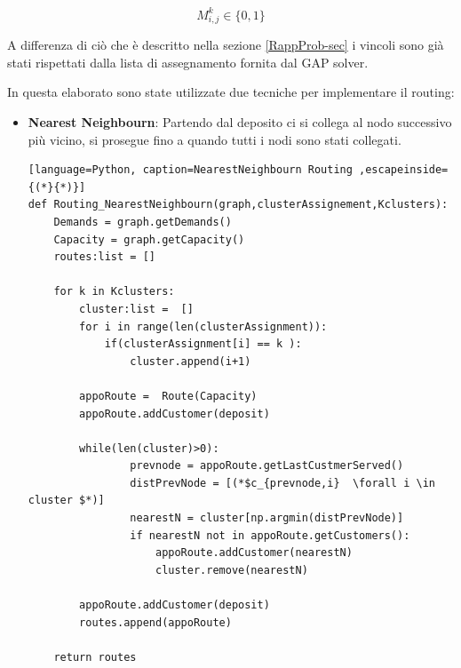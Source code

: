 \documentclass[]{article}
\begin{document}
\begin{equation} \label{}
M_{i,j}^k \in \{0,1\}
\end{equation}

A differenza di ciò che è descritto nella sezione  \ref{RappProb-sec} i vincoli sono già stati rispettati dalla lista di assegnamento fornita dal GAP solver.



In questa elaborato sono state utilizzate due tecniche per implementare il routing:
\begin{itemize}
\item \textbf{Nearest Neighbourn}: Partendo dal deposito ci si collega al nodo successivo più vicino, si prosegue fino a quando tutti i nodi sono stati collegati.

\begin{lstlisting}[language=Python, caption=NearestNeighbourn Routing ,escapeinside={(*}{*)}]
def Routing_NearestNeighbourn(graph,clusterAssignement,Kclusters):
	Demands = graph.getDemands()
	Capacity = graph.getCapacity()
	routes:list = []
	
	for k in Kclusters:
		cluster:list =  []
		for i in range(len(clusterAssignment)):
			if(clusterAssignment[i] == k ):
				cluster.append(i+1)
				
		appoRoute =  Route(Capacity) 
		appoRoute.addCustomer(deposit)
			
	    while(len(cluster)>0):
				prevnode = appoRoute.getLastCustmerServed()
				distPrevNode = [(*$c_{prevnode,i}  \forall i \in cluster $*)]
				nearestN = cluster[np.argmin(distPrevNode)] 
				if nearestN not in appoRoute.getCustomers():
					appoRoute.addCustomer(nearestN)
					cluster.remove(nearestN)
			
		appoRoute.addCustomer(deposit)
		routes.append(appoRoute)
			
	return routes


\end{lstlisting}
\end{itemize}
\end{document}
